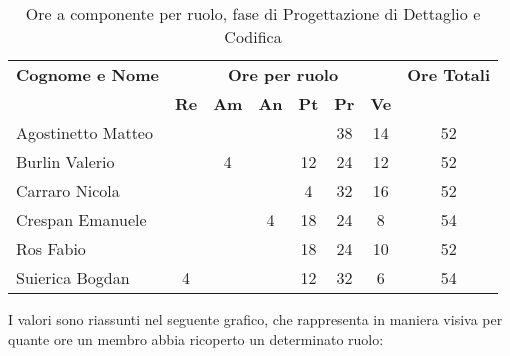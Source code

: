 \begin{table}[h]
	\centering
	\begin{tabular}{|l|c|c|c|c|c|c|c|}
		\toprule
		\textbf{Cognome e Nome} & \multicolumn{6}{c}{\textbf{Ore per ruolo}} & \textbf{Ore Totali} \\
		& \textbf{Re} & \textbf{Am} & \textbf{An} & \textbf{Pt} & \textbf{Pr} & \textbf{Ve} & \\
		
		\midrule
		Agostinetto Matteo & & & & & 38 & 14 & 52 \\
		Burlin Valerio & & 4 & & 12 & 24 & 12 & 52 \\ 
		Carraro Nicola & & & & 4 & 32 & 16 & 52 \\
		Crespan Emanuele & & & 4 & 18 & 24 & 8 & 54 \\
		Ros Fabio & & & & 18 & 24 & 10 & 52 \\
		Suierica Bogdan & 4 & & & 12 & 32 & 6 & 54 \\
		
		\bottomrule
	\end{tabular}
	\caption{Ore a componente per ruolo, fase di Progettazione di Dettaglio e Codifica}
\end{table}

\noindent I valori sono riassunti nel seguente grafico, che rappresenta in maniera visiva per quante ore un membro abbia ricoperto un determinato ruolo:


